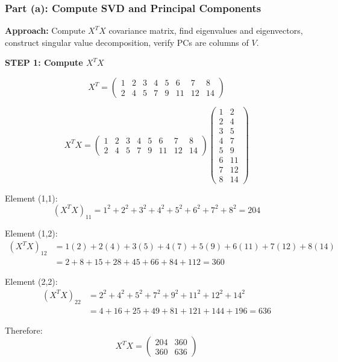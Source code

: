 \documentclass[12pt]{article}
\begin{document}
\subsubsection{Part (a): Compute SVD and Principal Components}

\begin{solution}

\textbf{Approach:} Compute $X^T X$ covariance matrix, find eigenvalues and eigenvectors, construct singular value decomposition, verify PCs are columns of $V$.

\textbf{STEP 1: Compute $X^T X$}

\[
X^T = \begin{pmatrix}
1 & 2 & 3 & 4 & 5 & 6 & 7 & 8 \\
2 & 4 & 5 & 7 & 9 & 11 & 12 & 14
\end{pmatrix}
\]

\[
X^T X = \begin{pmatrix}
1 & 2 & 3 & 4 & 5 & 6 & 7 & 8 \\
2 & 4 & 5 & 7 & 9 & 11 & 12 & 14
\end{pmatrix}
\begin{pmatrix}
1 & 2 \\
2 & 4 \\
3 & 5 \\
4 & 7 \\
5 & 9 \\
6 & 11 \\
7 & 12 \\
8 & 14
\end{pmatrix}
\]

Element (1,1):
\[
(X^T X)_{11} = 1^2 + 2^2 + 3^2 + 4^2 + 5^2 + 6^2 + 7^2 + 8^2 = 204
\]

Element (1,2):
\begin{align*}
(X^T X)_{12} &= 1(2) + 2(4) + 3(5) + 4(7) + 5(9) + 6(11) + 7(12) + 8(14) \\
&= 2 + 8 + 15 + 28 + 45 + 66 + 84 + 112 = 360
\end{align*}

Element (2,2):
\begin{align*}
(X^T X)_{22} &= 2^2 + 4^2 + 5^2 + 7^2 + 9^2 + 11^2 + 12^2 + 14^2 \\
&= 4 + 16 + 25 + 49 + 81 + 121 + 144 + 196 = 636
\end{align*}

Therefore:
\[
X^T X = \begin{pmatrix}
204 & 360 \\
360 & 636
\end{pmatrix}
\]


\end{solution}
\end{document}
